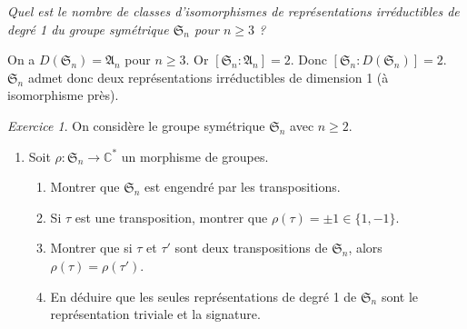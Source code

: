\documentclass[french]{book}
\theoremstyle{definition}
\theoremstyle{remark}
\newtheorem{exo}{Exercice}
\begin{document}
\emph{Quel est le nombre de classes d'isomorphismes de représentations irréductibles de degré 1 du groupe symétrique \(\mathfrak{S}_n\) pour \(n \geq 3\) ?}

On a \(D(\mathfrak{S}_n) = \mathfrak{A}_n\) pour \(n \geq 3\). Or \([\mathfrak{S}_n : \mathfrak{A}_n] = 2\). Donc \([\mathfrak{S}_n : D(\mathfrak{S}_n)]= 2\). \(\mathfrak{S}_n\) admet donc deux représentations irréductibles de dimension 1 (à isomorphisme près).


\begin{exo}
  On considère le groupe symétrique \(\mathfrak{S}_n\) avec \(n \geq 2\).

  \begin{enumerate}
    \item Soit \(\rho : \mathfrak{S}_n \longrightarrow \mathbb{C}^{*}\) un morphisme de groupes.
    \begin{enumerate}
      \item Montrer que \(\mathfrak{S}_n\) est engendré par les transpositions.
      \item Si \(\tau\) est une transposition, montrer que \(\rho(\tau) = \pm 1 \in \{1, -1\}\).
      \item Montrer que si \(\tau\) et \(\tau'\) sont deux transpositions de \(\mathfrak{S}_n\), alors \(\rho(\tau) = \rho(\tau')\).
      \item En déduire que les seules représentations de degré 1 de \(\mathfrak{S}_n\) sont le représentation triviale et la signature.
    \end{enumerate}


\end{enumerate}
\end{exo}
\end{document}

